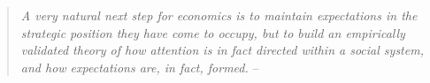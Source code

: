   \begin{quote}
    \textit{A very natural next step for economics is to maintain expectations in	the strategic position they have come to occupy, but to build an empirically validated theory of how attention is in fact directed within a social system, and how expectations are, in fact, formed.}
    \medskip
    \indent -- 
  \end{quote}
